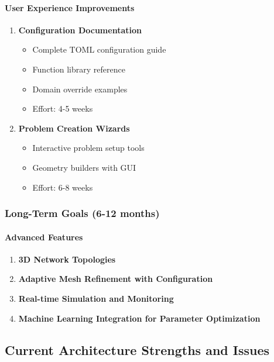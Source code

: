 \paragraph{User Experience Improvements}
\begin{enumerate}
    \item \textbf{Configuration Documentation}
    \begin{itemize}
        \item Complete TOML configuration guide
        \item Function library reference
        \item Domain override examples
        \item Effort: 4-5 weeks
    \end{itemize}
    
    \item \textbf{Problem Creation Wizards}
    \begin{itemize}
        \item Interactive problem setup tools
        \item Geometry builders with GUI
        \item Effort: 6-8 weeks
    \end{itemize}
\end{enumerate}

\subsubsection{Long-Term Goals (6-12 months)}

\paragraph{Advanced Features}
\begin{enumerate}
    \item \textbf{3D Network Topologies}
    \item \textbf{Adaptive Mesh Refinement with Configuration}
    \item \textbf{Real-time Simulation and Monitoring}
    \item \textbf{Machine Learning Integration for Parameter Optimization}
\end{enumerate}

\subsection{Current Architecture Strengths and Issues}


